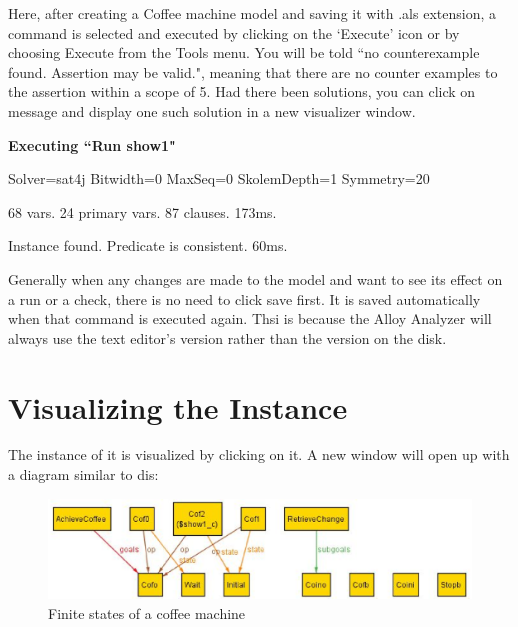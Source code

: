 \documentclass[a4paper,12pt]{report}
\begin{document}
Here, after creating a Coffee machine model and saving it with .als extension, a command is selected and executed by clicking on the `Execute' icon or by choosing Execute from the Tools menu. You will be told ``no counterexample found. Assertion may be valid.", meaning that there are no counter examples to the assertion within a scope of 5. Had there been solutions, you can click on message and display one such solution in a new visualizer window.

\begin{mdframed}[style=MyFrame]
\lipsum[0]

\textbf{Executing ``Run show1"}

  Solver=sat4j Bitwidth=0 MaxSeq=0 SkolemDepth=1 Symmetry=20
  
   68 vars. 24 primary vars. 87 clauses. 173ms.
   
   Instance found. Predicate is consistent. 60ms.

\lipsum[0]
\end{mdframed}

Generally when any changes are made to the model and want to see its effect on a run or a check, there is no need to click save first. It is saved automatically when that command is executed again. Thsi is because the Alloy Analyzer will always use the text editor's version rather than the version on the disk.

\section{Visualizing the Instance}
The instance of it is visualized by clicking on it. A new window will open up with a diagram similar to dis:

\begin{figure}[ht!]
\centering
\includegraphics[width=1.0\textwidth]{viz1}
\caption{Finite states of a coffee machine}
\end{figure}
 
\end{document}
